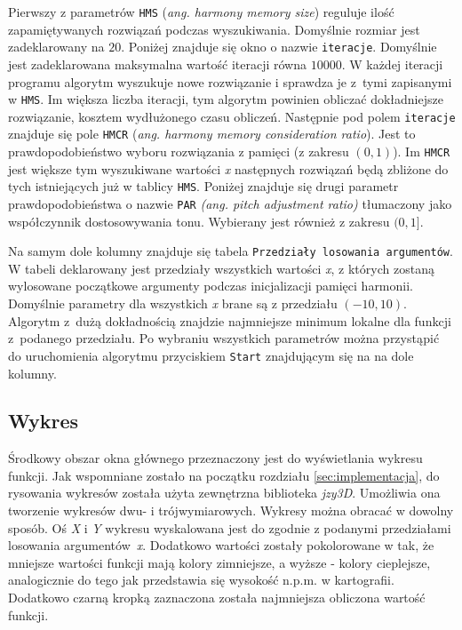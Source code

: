 \documentclass[10pt, a4paper]{article}
\begin{document}
Pierwszy z parametrów {\tt HMS} ({\em ang. harmony memory size}) reguluje ilość zapamiętywanych rozwiązań podczas wyszukiwania. Domyślnie rozmiar jest zadeklarowany na $20$. Poniżej znajduje się okno o nazwie {\tt iteracje}. Domyślnie jest zadeklarowana maksymalna wartość iteracji równa $10000$. W każdej iteracji programu algorytm wyszukuje nowe rozwiązanie i sprawdza je z~tymi zapisanymi w {\tt HMS}. Im większa liczba iteracji, tym algorytm powinien obliczać dokładniejsze rozwiązanie, kosztem wydłużonego czasu obliczeń. Następnie pod polem {\tt iteracje} znajduje się pole {\tt HMCR} ({\em ang. harmony memory consideration ratio}). Jest to prawdopodobieństwo wyboru rozwiązania z pamięci (z zakresu $(0, 1)$). Im {\tt HMCR} jest większe tym wyszukiwane wartości {\em x} następnych rozwiązań będą zbliżone do tych istniejących już w tablicy {\tt HMS}. Poniżej znajduje się drugi parametr prawdopodobieństwa o nazwie {\tt PAR} {\em(ang. pitch adjustment ratio)} tłumaczony jako współczynnik dostosowywania tonu. Wybierany jest również z zakresu $(0, 1]$. 

Na samym dole kolumny znajduje się tabela {\tt Przedziały losowania argumentów}. W tabeli deklarowany jest przedziały wszystkich wartości {\em x}, z których zostaną wylosowane początkowe argumenty podczas inicjalizacji pamięci harmonii. Domyślnie parametry dla wszystkich {\em x} brane są z przedziału $(-10, 10)$. Algorytm z~dużą dokładnością znajdzie najmniejsze minimum lokalne dla funkcji z~podanego przedziału. Po wybraniu wszystkich parametrów można przystąpić do uruchomienia algorytmu przyciskiem {\tt Start} znajdującym się na na dole kolumny.

\subsection{Wykres}
\label{subsec:wykres}
Środkowy obszar okna głównego przeznaczony jest do wyświetlania wykresu funkcji. Jak wspomniane zostało na początku rozdziału \ref{sec:implementacja}, do rysowania wykresów została użyta zewnętrzna biblioteka {\em jzy3D}. Umożliwia ona tworzenie wykresów dwu- i trójwymiarowych. Wykresy można obracać w dowolny sposób. Oś {\em X} i {\em Y} wykresu wyskalowana jest do zgodnie z podanymi przedziałami losowania argumentów~{\em x}. Dodatkowo wartości zostały pokolorowane w tak, że mniejsze wartości funkcji mają kolory zimniejsze, a wyższe - kolory cieplejsze, analogicznie do tego jak przedstawia się wysokość n.p.m. w kartografii. Dodatkowo czarną kropką zaznaczona została najmniejsza obliczona wartość funkcji. 
\end{document}
